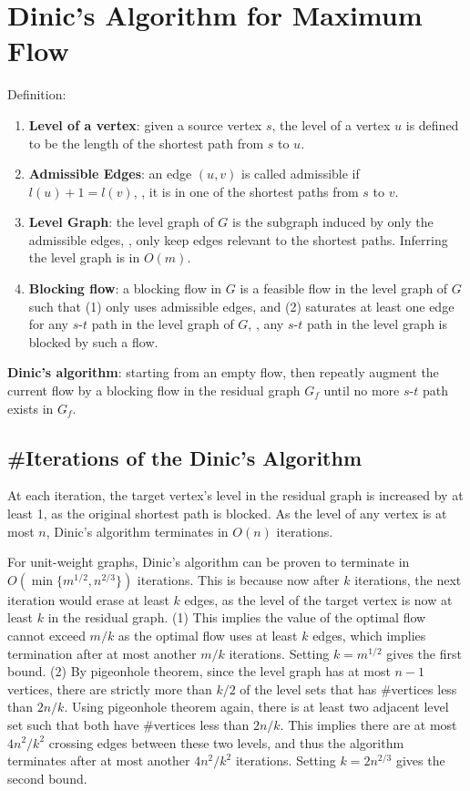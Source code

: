 \section{Dinic's Algorithm for Maximum Flow}

Definition:
\begin{enumerate}
    \item \textbf{Level of a vertex}: given a source vertex $s$, the level of a vertex $u$ is defined to be the length of the shortest path from $s$ to $u$.
    \item \textbf{Admissible Edges}: an edge $(u, v)$ is called admissible if $l(u)+1=l(v)$, \ie, it is in one of the shortest paths from $s$ to $v$.
    \item \textbf{Level Graph}: the level graph of $G$ is the subgraph induced by only the admissible edges, \ie, only keep edges relevant to the shortest paths. Inferring the level graph is in $O(m)$.
    \item \textbf{Blocking flow}: a blocking flow in $G$ is a feasible flow in the level graph of $G$ such that (1) only uses admissible edges, and (2) saturates at least one edge for any $s$-$t$ path in the level graph of $G$, \ie, any $s$-$t$ path in the level graph is blocked by such a flow.
\end{enumerate}

\textbf{Dinic's algorithm}: starting from an empty flow, then repeatly augment the current flow by a blocking flow in the residual graph $G_f$ until no more $s$-$t$ path exists in $G_f$.

\subsection{\#Iterations of the Dinic's Algorithm}

At each iteration, the target vertex's level in the residual graph is increased by at least 1, as the original shortest path is blocked. As the level of any vertex is at most $n$, Dinic's algorithm terminates in $O(n)$ iterations. 

For unit-weight graphs, Dinic's algorithm can be proven to terminate in $O(\min\{m^{1/2}, n^{2/3}\})$ iterations. This is because now after $k$ iterations, the next iteration would erase at least $k$ edges, as the level of the target vertex is now at least $k$ in the residual graph. (1) This implies the value of the optimal flow cannot exceed $m/k$ as the optimal flow uses at least $k$ edges, which implies termination after at most another $m/k$ iterations. Setting $k=m^{1/2}$ gives the first bound. (2) By pigeonhole theorem, since the level graph has at most $n-1$ vertices, there are strictly more than $k/2$ of the level sets that has \#vertices less than $2n/k$. Using pigeonhole theorem again, there is at least two adjacent level set such that both have \#vertices less than $2n/k$. This implies there are at most $4n^2/k^2$ crossing edges between these two levels, and thus the algorithm terminates after at most another $4n^2/k^2$ iterations. Setting $k=2n^{2/3}$ gives the second bound.

